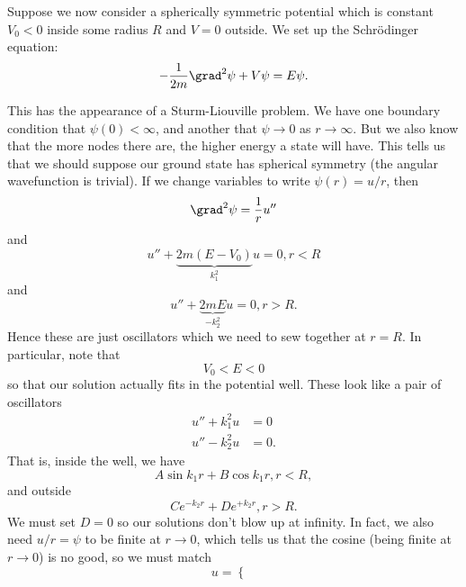 \begin{exm}
    Suppose we now consider a spherically symmetric potential which is constant $V_0<0$ inside some radius $R$ and $V=0$ outside. We set up the Schr\"odinger equation:
    \begin{equation}
        -\frac{1}{2m} \grad^2 \psi + V\psi = E \psi.
    \end{equation}
    
    This has the appearance of a Sturm-Liouville problem. We have one boundary condition that $\psi(0) < \infty$, and another that $\psi \to 0$ as $r\to \infty$. But we also know that the more nodes there are, the higher energy a state will have. This tells us that we should suppose our ground state has spherical symmetry (the angular wavefunction is trivial). If we change variables to write $\psi(r) = u/r$, then
    \begin{equation}
        \grad^2 \psi = \frac{1}{r} u''
    \end{equation}
    and
    \begin{equation}
        u'' + \underbrace{2m(E-V_0)}_{k_1^2}u =0, r< R
    \end{equation}
    and
    \begin{equation}
        u'' + \underbrace{2mE}_{-k_2^2} u =0, r> R.
    \end{equation}
    Hence these are just oscillators which we need to sew together at $r=R$. In particular, note that
    \begin{equation}
        V_0 < E < 0
    \end{equation}
    so that our solution actually fits in the potential well. These look like a pair of oscillators
    \begin{align}
        u'' + k_1^2 u &=0\\
        u'' - k_2^2 u &=0.
    \end{align}
    That is, inside the well, we have
    \begin{equation}
        A\sin k_1 r + B\cos k_1 r, r < R,
    \end{equation}
    and outside
    \begin{equation}
        C e^{-k_2 r} + D e^{+k_2 r}, r > R.
    \end{equation}
    We must set $D=0$ so our solutions don't blow up at infinity. In fact, we also need $u/r = \psi$ to be finite at $r\to 0$, which tells us that the cosine (being finite at $r\to 0$) is no good, so we must match
    \begin{equation}
        u = \begin{cases}

\end{cases}
\end{equation}
\end{exm}

